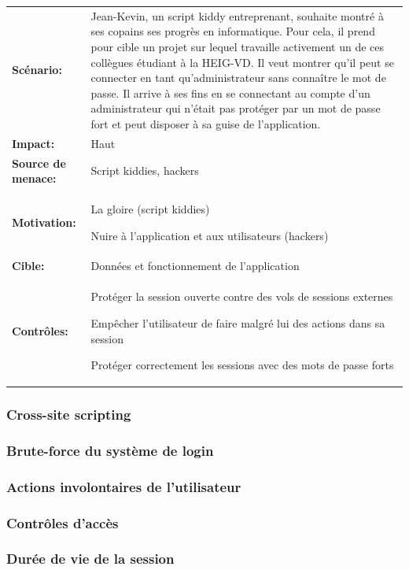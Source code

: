 \documentclass[12pt]{article}
\begin{document}
\renewcommand{\arraystretch}{1.6}
\begin{tabular}{@{}p{4cm}p{12cm}}
\textbf{Scénario:} &  Jean-Kevin, un script kiddy entreprenant, souhaite montré à ses copains ses progrès en informatique. Pour cela, il prend pour cible un projet sur lequel travaille activement un de ces collègues étudiant à la HEIG-VD. Il veut montrer qu'il peut se connecter en tant qu'administrateur sans connaître le
mot de passe. Il arrive à ses fins en se connectant au compte d'un
administrateur qui n'était pas protéger par un mot de passe fort et
peut disposer à sa guise de l'application.\\
\textbf{Impact:} & Haut \\
\textbf{Source de menace: } & Script kiddies, hackers \\
\textbf{Motivation:} & La gloire (script kiddies)

Nuire à l'application et aux utilisateurs (hackers)\\
\textbf{Cible:} & Données et fonctionnement de l'application \\
\textbf{Contrôles:} & Protéger la session ouverte contre des vols de sessions externes

Empêcher l'utilisateur de faire malgré lui des actions dans sa session

Protéger correctement les sessions avec des mots de passe forts
\end{tabular}
\renewcommand{\arraystretch}{1}

\subsubsection{Cross-site scripting}

\subsubsection{Brute-force du système de login}

\subsubsection{Actions involontaires de l'utilisateur}

\subsubsection{Contrôles d'accès}

\subsubsection{Durée de vie de la session}
\end{document}
